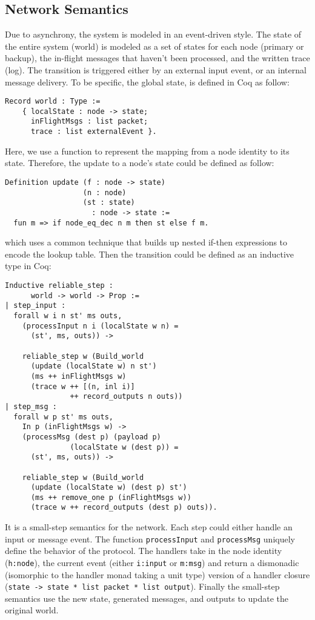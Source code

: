 \documentclass[twocolumn]{article}
\begin{document}
\subsection{Network Semantics}
Due to asynchrony, the system is modeled in an event-driven style. The state
of the entire system (world) is modeled as a set of states for each node
(primary or backup), the in-flight messages that haven't been processed, and
the written trace (log). The transition is triggered either by an external
input event, or an internal message delivery. To be specific, the global state,
is defined in Coq as follow:
\begin{center}
\small
\begin{verbatim}
Record world : Type :=
    { localState : node -> state;
      inFlightMsgs : list packet;
      trace : list externalEvent }.
\end{verbatim}
\end{center}
Here, we use a function to represent the mapping from a node identity to its
state. Therefore, the update to a node's state could be defined as follow:
\begin{center}
\small
\begin{verbatim}
Definition update (f : node -> state)
                  (n : node)
                  (st : state)
                    : node -> state :=
  fun m => if node_eq_dec n m then st else f m.
\end{verbatim}
\end{center}
which uses a common technique that builds up nested if-then expressions to
encode the lookup table. Then the transition could be defined as an inductive
type in Coq:
\begin{center}
\small
\begin{verbatim}
Inductive reliable_step :
      world -> world -> Prop :=
| step_input :
  forall w i n st' ms outs,
    (processInput n i (localState w n) =
      (st', ms, outs)) ->

    reliable_step w (Build_world
      (update (localState w) n st')
      (ms ++ inFlightMsgs w)
      (trace w ++ [(n, inl i)]
               ++ record_outputs n outs))
| step_msg :
  forall w p st' ms outs,
    In p (inFlightMsgs w) ->
    (processMsg (dest p) (payload p)
               (localState w (dest p)) =
      (st', ms, outs)) ->

    reliable_step w (Build_world
      (update (localState w) (dest p) st')
      (ms ++ remove_one p (inFlightMsgs w))
      (trace w ++ record_outputs (dest p) outs)).
\end{verbatim}
\end{center}
It is a small-step semantics for the network. Each step could either handle an
input or message event. The function \texttt{processInput} and
\texttt{processMsg} uniquely define the behavior of the protocol. The handlers
take in the node identity (\texttt{h:node}), the current event (either
\texttt{i:input} or \texttt{m:msg}) and return a dismonadic (isomorphic to the
handler monad taking a unit type) version of a handler closure (\texttt{state ->
state * list packet * list output}). Finally the small-step semantics use the
new state, generated messages, and outputs to update the original world.
\end{document}
